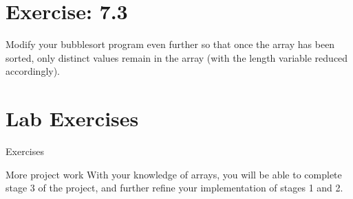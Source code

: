 \documentclass{beamer}
\begin{document}
\section{Exercise: 7.3}

\begin{frame}{7.3}
    Modify your bubblesort program even further so that once the array has
    been sorted, only distinct values remain in the array (with the length
    variable reduced accordingly).
\end{frame}

\section{Lab Exercises}

\begin{frame}{Exercises}
    \begin{block}{More project work}
        With your knowledge of arrays, you will be able to complete stage
        3 of the project, and further refine your implementation of stages
        1 and 2.
    \end{block}
\end{frame}
\end{document}

